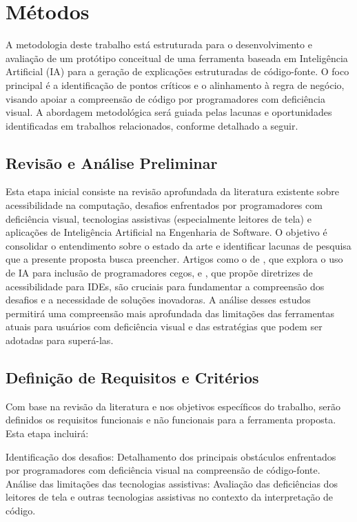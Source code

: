 \documentclass[
    12pt,                   %
    openright,              %
    oneside,                %
    a4paper,                %
    sumario=tradicional,    %
    english,                %
    brazil,                 %
    ]{abntex2}
\begin{document}
\chapter{Métodos}\label{sec:metodos}

A metodologia deste trabalho está estruturada para o desenvolvimento e avaliação de um protótipo conceitual de uma ferramenta baseada em Inteligência Artificial (IA) para a geração de explicações estruturadas de código-fonte. O foco principal é a identificação de pontos críticos e o alinhamento à regra de negócio, visando apoiar a compreensão de código por programadores com deficiência visual. A abordagem metodológica será guiada pelas lacunas e oportunidades identificadas em trabalhos relacionados, conforme detalhado a seguir.

\section{Revisão e Análise Preliminar}

Esta etapa inicial consiste na revisão aprofundada da literatura existente sobre acessibilidade na computação, desafios enfrentados por programadores com deficiência visual, tecnologias assistivas (especialmente leitores de tela) e aplicações de Inteligência Artificial na Engenharia de Software. O objetivo é consolidar o entendimento sobre o estado da arte e identificar lacunas de pesquisa que a presente proposta busca preencher. Artigos como o de \textcite{latinoware34224}, que explora o uso de IA para inclusão de programadores cegos, e \textcite{latinoware37693}, que propõe diretrizes de acessibilidade para IDEs, são cruciais para fundamentar a compreensão dos desafios e a necessidade de soluções inovadoras. A análise desses estudos permitirá uma compreensão mais aprofundada das limitações das ferramentas atuais para usuários com deficiência visual e das estratégias que podem ser adotadas para superá-las.

\section{Definição de Requisitos e Critérios}

Com base na revisão da literatura e nos objetivos específicos do trabalho, serão definidos os requisitos funcionais e não funcionais para a ferramenta proposta. Esta etapa incluirá:

Identificação dos desafios: Detalhamento dos principais obstáculos enfrentados por programadores com deficiência visual na compreensão de código-fonte. Análise das limitações das tecnologias assistivas: Avaliação das deficiências dos leitores de tela e outras tecnologias assistivas no contexto da interpretação de código.
\end{document}
